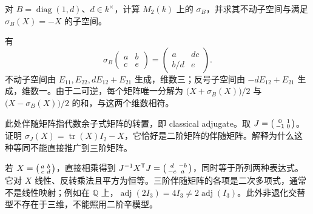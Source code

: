 \begin{exercise}\label{b2:ex:B-diagonal-adjoint}
	对 \(B=\operatorname{diag}(1,d)\)、\(d\in k^\times\)，计算 \(M_2(k)\) 上的 \(\sigma_B\)，并求其不动子空间与满足 \(\sigma_B(X)=-X\) 的子空间。
\end{exercise}
\begin{solution}
	有
	\[
		\sigma_B\begin{pmatrix}a&b\\c&e\end{pmatrix}
		=\begin{pmatrix}a&dc\\b/d&e\end{pmatrix}.
	\]
	不动子空间由 \(E_{11},E_{22},dE_{12}+E_{21}\) 生成，维数三；反号子空间由 \(-dE_{12}+E_{21}\) 生成，维数一。由于二可逆，每个矩阵唯一分解为 \(\bigl(X+\sigma_B(X)\bigr)/2\) 与 \(\bigl(X-\sigma_B(X)\bigr)/2\) 的和，与这两个维数相符。
\end{solution}

\begin{exercise}\label{b2:ex:B-symplectic-adjugate}
	此处伴随矩阵指代数余子式矩阵的转置，即 classical adjugate。取 \(J=\begin{psmallmatrix}0&1\\-1&0\end{psmallmatrix}\)。证明 \(\sigma_J(X)=\operatorname{tr}(X)I_2-X\)，它恰好是二阶矩阵的伴随矩阵。解释为什么这种等同不能直接推广到三阶矩阵。
\end{exercise}
\begin{solution}
	若 \(X=\begin{psmallmatrix}a&b\\c&d\end{psmallmatrix}\)，直接相乘得到 \(J^{-1}X^{\mathsf T}J=\begin{psmallmatrix}d&-b\\-c&a\end{psmallmatrix}\)，同时等于所列两种表达式。它对 \(X\) 线性、反转乘法且平方为恒等。三阶伴随矩阵的各项是二次多项式，通常不是线性映射；例如在 \(\mathbb Q\) 上，\(\operatorname{adj}(2I_3)=4I_3\ne2\operatorname{adj}(I_3)\)。此外非退化交替型不存在于三维，不能照用二阶辛模型。
\end{solution}

